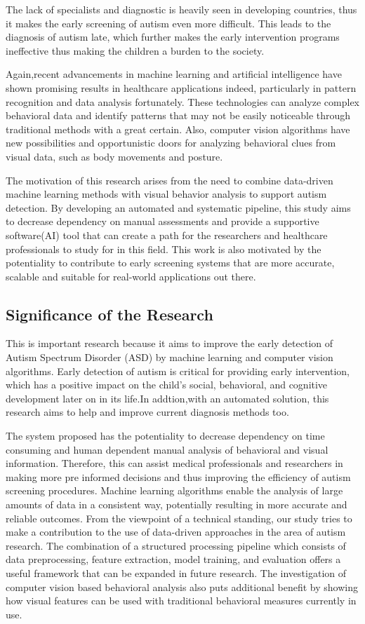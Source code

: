 The lack of specialists and diagnostic is heavily seen in developing countries, thus it makes the early screening of autism even more difficult. This leads to the diagnosis of autism late, which further makes the early intervention programs ineffective thus making the children a burden to the society.

Again,recent advancements in machine learning and artificial intelligence have shown promising results in healthcare applications indeed, particularly in pattern recognition and data analysis fortunately. These technologies can analyze complex behavioral data and identify patterns that may not be easily noticeable through traditional methods with a great certain. Also, computer vision algorithms have new possibilities and opportunistic doors for analyzing behavioral clues from visual data, such as body movements and posture.

The motivation of this research arises from the need to combine data-driven machine learning methods with visual behavior analysis to support autism detection. By developing an automated and systematic pipeline, this study aims to decrease dependency on manual assessments and provide a supportive software(AI) tool that can create a path for the researchers and healthcare professionals to study for in this field. This work is also motivated by the potentiality to contribute to early screening systems that are more accurate, scalable and suitable for real-world applications out there.

\subsection{Significance of the Research}
This is important research because it aims to improve the early detection of Autism Spectrum Disorder (ASD) by machine learning and computer vision algorithms. Early detection of autism is critical for providing early intervention, which has a positive impact on the child’s social, behavioral, and cognitive development later on in its life.In addtion,with an automated solution, this research aims to help and improve current diagnosis methods too.

The system proposed has the potentiality to decrease dependency on time consuming and human dependent manual analysis of behavioral and visual information. Therefore, this can assist medical professionals and researchers in making more pre informed decisions and thus improving the efficiency of autism screening procedures. Machine learning algorithms enable the analysis of large amounts of data in a consistent way, potentially resulting in more accurate and reliable outcomes.
From the viewpoint of a technical standing, our study tries to make a contribution to the use of data-driven approaches in the area of autism research. The combination of a structured processing pipeline which consists of data preprocessing, feature extraction, model training, and evaluation offers a useful framework that can be expanded in future research. The investigation of computer vision based behavioral analysis also puts additional benefit by showing how visual features can be used with  traditional behavioral measures currently in use.

